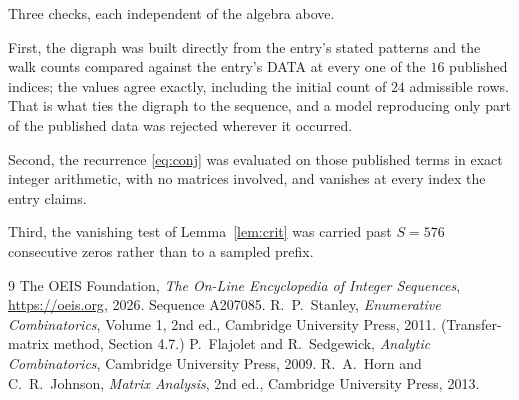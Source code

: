 \documentclass[11pt,a4paper]{article}
\theoremstyle{plain}
\theoremstyle{definition}
\begin{document}
Three checks, each independent of the algebra above.

First, the digraph was built directly from the entry's stated patterns and the walk counts
compared against the entry's DATA at every one of the $16$ published indices; the
values agree exactly, including the initial count of $24$ admissible rows. That is
what ties the digraph to the sequence, and a model reproducing only part of the published
data was rejected wherever it occurred.

Second, the recurrence \eqref{eq:conj} was evaluated on those published terms in exact
integer arithmetic, with no matrices involved, and vanishes at every index the entry claims.

Third, the vanishing test of Lemma~\ref{lem:crit} was carried past $S=576$ consecutive
zeros rather than to a sampled prefix.

\begin{thebibliography}{9}
 The OEIS Foundation, \emph{The On-Line Encyclopedia of Integer
Sequences}, \url{https://oeis.org}, 2026. Sequence A207085.
 R.~P.~Stanley, \emph{Enumerative Combinatorics}, Volume 1, 2nd ed.,
Cambridge University Press, 2011. (Transfer-matrix method, Section 4.7.)
 P.~Flajolet and R.~Sedgewick, \emph{Analytic Combinatorics}, Cambridge
University Press, 2009.
 R.~A.~Horn and C.~R.~Johnson, \emph{Matrix Analysis}, 2nd ed., Cambridge
University Press, 2013.
\end{thebibliography}
\end{document}
